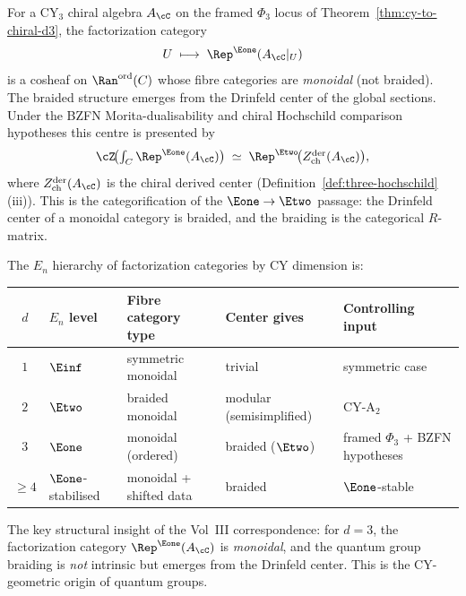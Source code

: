 For a CY$_3$ chiral algebra $A_\cC$ on the framed $\Phi_3$ locus of
Theorem~\textup{\ref{thm:cy-to-chiral-d3}}, the factorization category
\[
 U \;\longmapsto\; \Rep^{\Eone}(A_\cC|_U)
\]
is a cosheaf on $\Ran^{\mathrm{ord}}(C)$ whose fibre categories are \emph{monoidal} (not braided). The braided structure emerges from the Drinfeld center of the global sections. Under the BZFN Morita-dualisability and chiral Hochschild comparison hypotheses this centre is presented by
\begin{equation}
\label{eq:drinfeld-center-factcat}
 \cZ\!\bigl(\textstyle\int_C \Rep^{\Eone}(A_\cC)\bigr)
 \;\simeq\;
 \Rep^{\Etwo}\!\bigl(Z^{\mathrm{der}}_{\mathrm{ch}}(A_\cC)\bigr),
\end{equation}
where $Z^{\mathrm{der}}_{\mathrm{ch}}(A_\cC)$ is the chiral derived center (Definition~\ref{def:three-hochschild}(iii)). This is the categorification of the $\Eone \to \Etwo$ passage: the Drinfeld center of a monoidal category is braided, and the braiding is the categorical $R$-matrix.

The $E_n$ hierarchy of factorization categories by CY dimension is:
\begin{center}
\renewcommand{\arraystretch}{1.2}
\begin{tabular}{cllll}
 \toprule
 $d$ & $E_n$ level & Fibre category type & Center gives & Controlling input \\
 \midrule
 $1$ & $\Einf$ & symmetric monoidal & trivial & symmetric case \\
 $2$ & $\Etwo$ & braided monoidal & modular (semisimplified) & CY-A$_2$ \\
 $3$ & $\Eone$ & monoidal (ordered) & braided ($\Etwo$) & framed $\Phi_3$ + BZFN hypotheses \\
 $\geq 4$ & $\Eone$-stabilised & monoidal + shifted data & braided & $\Eone$-stable \\
 \bottomrule
\end{tabular}
\end{center}
The key structural insight of the Vol~III correspondence: for $d = 3$, the factorization category $\Rep^{\Eone}(A_\cC)$ is \emph{monoidal}, and the quantum group braiding is \emph{not} intrinsic but emerges from the Drinfeld center. This is the CY-geometric origin of quantum groups.

